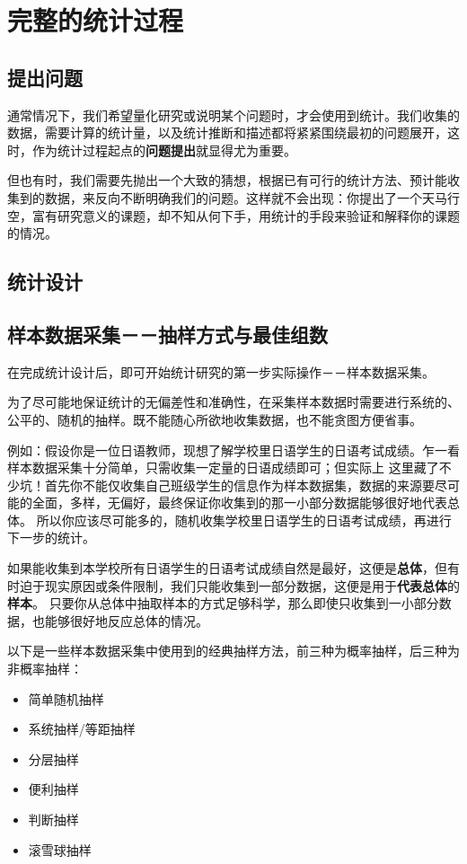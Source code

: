 \documentclass[lang=cn,10pt]{elegantbook}
\begin{document}
\chapter{完整的统计过程}
\section{提出问题}
通常情况下，我们希望量化研究或说明某个问题时，才会使用到统计。我们收集的数据，需要计算的统计量，以及统计推断和描述都将紧紧围绕最初的问题展开，这时，作为统计过程起点的\textbf{问题提出}就显得尤为重要。

但也有时，我们需要先抛出一个大致的猜想，根据已有可行的统计方法、预计能收集到的数据，来反向不断明确我们的问题。这样就不会出现：你提出了一个天马行空，富有研究意义的课题，却不知从何下手，用统计的手段来验证和解释你的课题的情况。


\section{统计设计}



\section{样本数据采集－－抽样方式与最佳组数}
在完成统计设计后，即可开始统计研究的第一步实际操作－－样本数据采集。

为了尽可能地保证统计的无偏差性和准确性，在采集样本数据时需要进行系统的、公平的、随机的抽样。既不能随心所欲地收集数据，也不能贪图方便省事。

例如：假设你是一位日语教师，现想了解学校里日语学生的日语考试成绩。乍一看样本数据采集十分简单，只需收集一定量的日语成绩即可；但实际上
这里藏了不少坑！首先你不能仅收集自己班级学生的信息作为样本数据集，数据的来源要尽可能的全面，多样，无偏好，最终保证你收集到的那一小部分数据能够很好地代表总体。
所以你应该尽可能多的，随机收集学校里日语学生的日语考试成绩，再进行下一步的统计。

\begin{remark}
如果能收集到本学校所有日语学生的日语考试成绩自然是最好，这便是\textbf{总体}，但有时迫于现实原因或条件限制，我们只能收集到一部分数据，这便是用于\textbf{代表总体}的\textbf{样本}。
只要你从总体中抽取样本的方式足够科学，那么即使只收集到一小部分数据，也能够很好地反应总体的情况。
\end{remark}

以下是一些样本数据采集中使用到的经典抽样方法，前三种为概率抽样，后三种为非概率抽样：
\begin{itemize}
  \item 简单随机抽样
  \item 系统抽样/等距抽样
  \item 分层抽样
  \item 便利抽样
  \item 判断抽样
  \item 滚雪球抽样
\end{itemize}
\end{document}
